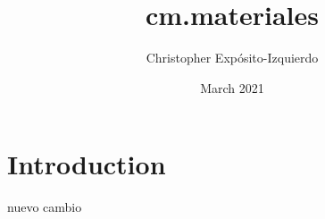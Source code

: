 \documentclass{article}
\title{cm.materiales}
\author{Christopher Expósito-Izquierdo}
\date{March 2021}
\begin{document}
\maketitle

\section{Introduction}

nuevo cambio
\end{document}
